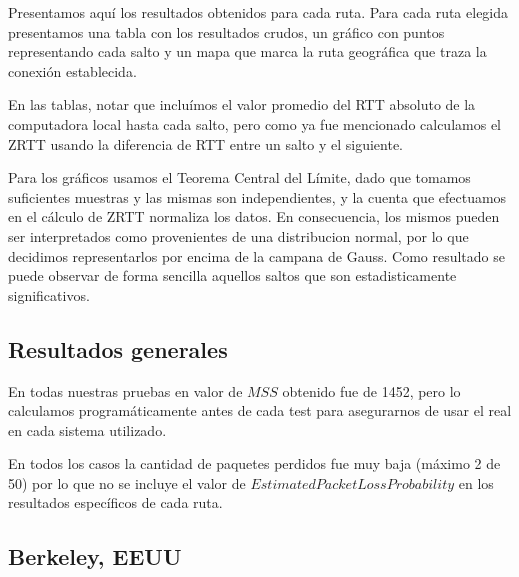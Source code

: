 Presentamos aquí los resultados obtenidos para cada ruta.
Para cada ruta elegida presentamos una tabla con los resultados crudos, un gráfico con puntos representando cada salto y un mapa que marca la ruta geográfica que traza la conexión establecida.

En las tablas, notar que incluímos el valor promedio del RTT absoluto de la computadora local hasta cada salto, pero como ya fue mencionado calculamos el ZRTT usando la diferencia de RTT entre un salto y el siguiente.

Para los gráficos usamos el Teorema Central del Límite, dado que tomamos suficientes muestras y las mismas son independientes, y la cuenta que efectuamos en el cálculo de ZRTT normaliza los datos. En consecuencia, los mismos pueden ser interpretados como provenientes de una distribucion normal, por lo que decidimos representarlos por encima de la campana de Gauss. Como resultado se puede observar de forma sencilla aquellos saltos que son estadisticamente significativos.

\subsection{Resultados generales}
 En todas nuestras pruebas en valor de $MSS$ obtenido fue de 1452, pero lo calculamos programáticamente antes de cada test para asegurarnos de usar el real en cada sistema utilizado.

 En todos los casos la cantidad de paquetes perdidos fue muy baja (máximo 2 de 50) por lo que no se incluye el valor de $EstimatedPacketLossProbability$ en los resultados específicos de cada ruta.

\subsection{Berkeley, EEUU}

